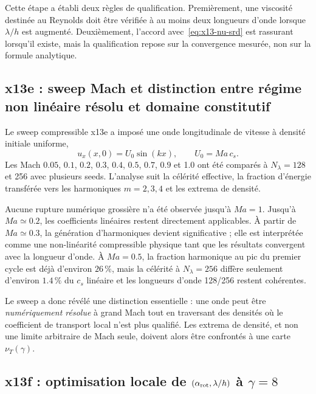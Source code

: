 \documentclass[11pt,a4paper]{article}
\begin{document}
Cette étape a établi deux règles de qualification. Premièrement, une viscosité destinée au Reynolds doit être vérifiée à au moins deux longueurs d'onde lorsque $\lambda/h$ est augmenté. Deuxièmement, l'accord avec~\eqref{eq:x13-nu-srd} est rassurant lorsqu'il existe, mais la qualification repose sur la convergence mesurée, non sur la formule analytique.

\subsection{x13e : sweep Mach et distinction entre régime non linéaire résolu et domaine constitutif}

Le sweep compressible x13e a imposé une onde longitudinale de vitesse à densité initiale uniforme,
\begin{equation}
  u_x(x,0)=U_0\sin(kx),
  \qquad
  U_0=Ma\,c_s.
  \label{eq:x13-mach-init}
\end{equation}
Les Mach $0.05$, $0.1$, $0.2$, $0.3$, $0.4$, $0.5$, $0.7$, $0.9$ et 1.0 ont été comparés à $N_\lambda=128$ et 256 avec plusieurs seeds. L'analyse suit la célérité effective, la fraction d'énergie transférée vers les harmoniques $m=2,3,4$ et les extrema de densité.

Aucune rupture numérique grossière n'a été observée jusqu'à $Ma=1$. Jusqu'à $Ma\simeq0.2$, les coefficients linéaires restent directement applicables. À partir de $Ma\simeq0.3$, la génération d'harmoniques devient significative ; elle est interprétée comme une non-linéarité compressible physique tant que les résultats convergent avec la longueur d'onde. À $Ma=0.5$, la fraction harmonique au pic du premier cycle est déjà d'environ $26\,\%$, mais la célérité à $N_\lambda=256$ diffère seulement d'environ $1.4\,\%$ du $c_s$ linéaire et les longueurs d'onde 128/256 restent cohérentes.

Le sweep a donc révélé une distinction essentielle : une onde peut être \emph{numériquement résolue} à grand Mach tout en traversant des densités où le coefficient de transport local n'est plus qualifié. Les extrema de densité, et non une limite arbitraire de Mach seule, doivent alors être confrontés à une carte $\nu_T(\gamma)$.

\subsection{x13f : optimisation locale de \texorpdfstring{$(\alpha_{\rm rot},\lambda/h)$}{(alpha,lambda/h)} à \texorpdfstring{$\gamma=8$}{gamma=8}}
\end{document}
